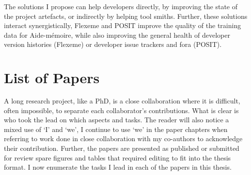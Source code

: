 The solutions I propose can help developers directly, by improving the state of
the project artefacts, or indirectly by helping tool smiths. Further, these
solutions interact synergistically, Flexeme and POSIT improve the quality of
the training data for Aide-mémoire, while also improving the general health of
developer version histories (Flexeme) or developer issue trackers and fora
(POSIT).

\section{List of Papers}
\label{chapter:introduction:sec:papers}

A long research project, like a PhD, is a close collaboration where it is
difficult, often impossible, to separate each collaborator's contributions. What
is clear is who took the lead on which aspects and tasks. The reader will also
notice a mixed use of `I' and `we', I continue to use `we' in the paper chapters
when referring to work done in close collaboration with my co-authors to
acknowledge their contribution. Further, the papers are presented as published
or submitted for review spare figures and tables that required editing to fit
into the thesis format. I now enumerate the tasks I lead in each of the papers
in this thesis.

